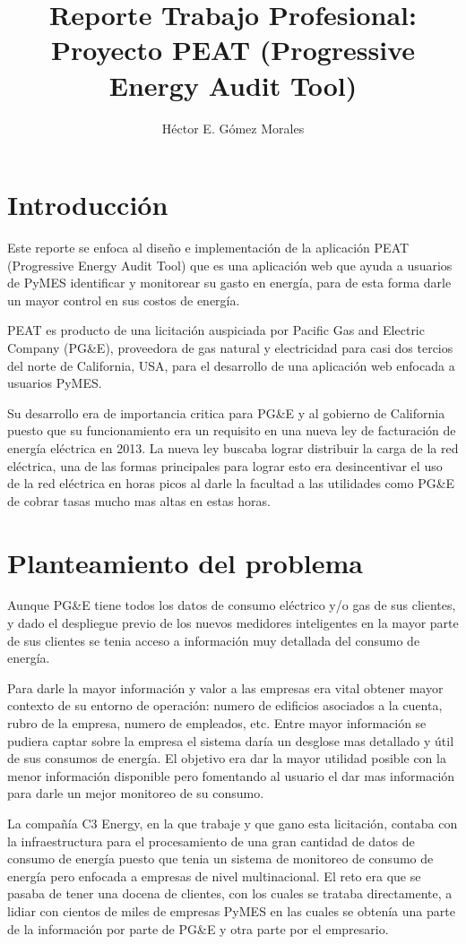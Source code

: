 \documentclass{article}
\author{Héctor E. Gómez Morales}
\title{Reporte Trabajo Profesional: Proyecto PEAT (Progressive Energy
  Audit Tool)}
\begin{document}
\maketitle
\tableofcontents
\section{Introducción}
Este reporte se enfoca al diseño e implementación de la aplicación
PEAT (Progressive Energy Audit Tool) que es una aplicación web que
ayuda a usuarios de PyMES identificar y monitorear su gasto en
energía, para de esta forma darle un mayor control en sus costos de
energía.

PEAT es producto de una licitación auspiciada por Pacific Gas and
Electric Company (PG\&E), proveedora de gas natural y electricidad
para casi dos tercios del norte de California, USA, para
el desarrollo de una aplicación web enfocada a usuarios PyMES.

Su desarrollo era de importancia critica para PG\&E y al gobierno de
California puesto que su funcionamiento era un requisito en una nueva
ley de facturación de energía eléctrica en 2013. La nueva ley buscaba
lograr distribuir la carga de la red eléctrica, una de las formas
principales para lograr esto era desincentivar el uso de la red
eléctrica en horas picos al darle la facultad a las utilidades como PG\&E
de cobrar tasas mucho mas altas en estas horas.
\section{Planteamiento del problema}
Aunque PG\&E tiene todos los datos de consumo eléctrico y/o gas de
sus clientes, y dado el despliegue previo de los nuevos medidores
inteligentes en la mayor parte de sus clientes se tenia acceso a
información muy detallada del consumo de energía.

Para darle la mayor información y valor a las empresas era
vital obtener mayor contexto de su entorno de operación: numero
de edificios asociados a la cuenta, rubro de la empresa, numero de
empleados, etc. Entre mayor información se pudiera captar sobre la
empresa el sistema daría un desglose mas detallado y útil de sus
consumos de energía. El objetivo era dar la mayor utilidad posible con
la menor información disponible pero fomentando al usuario el dar
mas información para darle un mejor monitoreo de su consumo.

La compañía C3 Energy, en la que trabaje y que gano esta licitación,
contaba con la infraestructura para el procesamiento de una gran
cantidad de datos de consumo de energía puesto que tenia un sistema
de monitoreo de consumo de energía pero enfocada a empresas de nivel
multinacional. El reto era que se pasaba de tener una docena
de clientes, con los cuales se trataba directamente, a lidiar con
cientos de miles de empresas PyMES en las cuales se obtenía una
parte de la información por parte de PG\&E y otra parte por el
empresario.
\end{document}
